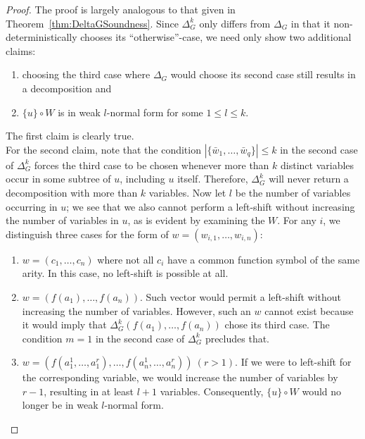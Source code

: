 \documentclass[a4paper, 11pt]{report}
\begin{document}
\begin{proof}
The proof is largely analogous to that given in Theorem~\ref{thm:DeltaGSoundness}. Since $\Delta_G^k$ only differs from $\Delta_G$ in that it non-deterministically chooses its ``otherwise''-case, we need only show two additional claims:

\begin{enumerate}
  \item choosing the third case where $\Delta_G$ would choose its second case still results in a decomposition and
  \item $\{u\} \circ W$ is in weak $l$-normal form for some $1 \leq l \leq k$.
\end{enumerate}

The first claim is clearly true.\\

For the second claim, note that the condition $|\{\bar{w}_1,\dots,\bar{w}_q\}| \leq k$ in the second case of $\Delta_G^k$ forces the third case to be chosen whenever more than $k$ distinct variables occur in some subtree of $u$, including $u$ itself. Therefore, $\Delta_G^k$ will never return a decomposition with more than $k$ variables. Now let $l$ be the number of variables occurring in $u$; we see that we also cannot perform a left-shift without increasing the number of variables in $u$, as is evident by examining the $W$. For any $i$, we distinguish three cases for the form of $w = (w_{i,1},\dots,w_{i,n})$:
\begin{enumerate}
  \item $w = (c_1,\dots,c_n)$ where not all $c_i$ have a common function symbol of the same arity. In this case, no left-shift is possible at all.
  \item $w = (f(a_1),\dots,f(a_n))$. Such vector would permit a left-shift without increasing the number of variables. However, such an $w$ cannot exist because it would imply that $\Delta_G^k(f(a_1),\dots,f(a_n))$ chose its third case. The condition $m = 1$ in the second case of $\Delta_G^k$ precludes that.
  \item $w = (f(a_1^1,\dots,a_1^r),\dots,f(a_n^1,\dots,a_n^r))\ (r > 1)$. If we were to left-shift for the corresponding variable, we would increase the number of variables by $r-1$, resulting in at least $l+1$ variables. Consequently, $\{u\} \circ W$ would no longer be in weak $l$-normal form.
\end{enumerate}
\end{proof}

\end{document}

